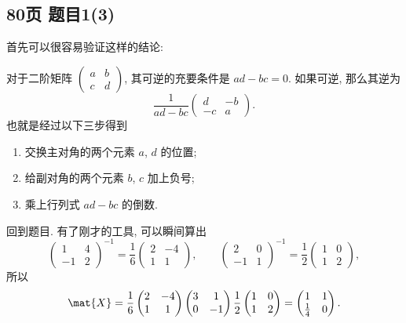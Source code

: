 \subsection*{80页 题目1(3)}
首先可以很容易验证这样的结论:
\begin{proposition}
    对于二阶矩阵 $\begin{pmatrix} a & b \\ c & d \end{pmatrix}$, 其可逆的充要条件是 $ad - bc = 0$. 如果可逆, 那么其逆为
    \[
    \dfrac{1}{ad - bc}
    \begin{pmatrix}
        d & -b \\
        -c & a
    \end{pmatrix}.
    \]
    也就是经过以下三步得到
    \begin{enumerate}
        \item 交换主对角的两个元素 $a$, $d$ 的位置;
        \item 给副对角的两个元素 $b$, $c$ 加上负号;
        \item 乘上行列式 $ad - bc$ 的倒数.
    \end{enumerate}
\end{proposition}

回到题目. 有了刚才的工具, 可以瞬间算出
\[
\begin{pmatrix}
    1 & 4 \\ -1 & 2
\end{pmatrix}^{-1}
=\frac{1}{6}
\begin{pmatrix}
    2 & -4 \\ 1 & 1
\end{pmatrix}, \qquad
\begin{pmatrix}
    2 & 0 \\ -1 & 1
\end{pmatrix}^{-1}
=\frac{1}{2}
\begin{pmatrix}
    1 & 0 \\ 1 & 2
\end{pmatrix},
\]
所以
\[
\mat{X} = \frac{1}{6}
\begin{pmatrix}
    2 & -4 \\ 1 & 1
\end{pmatrix}
\begin{pmatrix}
    3 & 1 \\ 0 & -1
\end{pmatrix}
\frac{1}{2}
\begin{pmatrix}
    1 & 0 \\ 1 & 2
\end{pmatrix}
=
\begin{pmatrix}
    1 & 1 \\ \frac{1}{4} & 0
\end{pmatrix}.
\]

